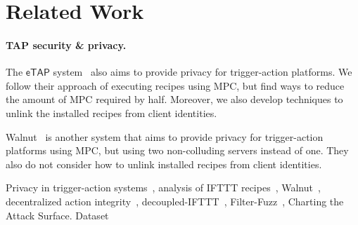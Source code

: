 \section{Related Work}
\label{sec:related}

\paragraph{TAP security \& privacy.}
The $\mathsf{eTAP}$ system~\cite{DBLP:conf/sp/ChenCWSCF21} also aims to provide
privacy for trigger-action platforms. We follow their approach of executing
recipes using MPC, but find ways to reduce the amount of MPC required by
half. Moreover, we also develop techniques to unlink the installed recipes from
client identities.

Walnut~\cite{DBLP:journals/corr/abs-2009-12447} is another system that aims to
provide privacy for trigger-action platforms using MPC, but using two
non-colluding servers instead of one. They also do not consider how to unlink
installed recipes from client identities.

Privacy in trigger-action systems~\cite{DBLP:conf/sp/ChenCWSCF21}, analysis of
IFTTT
recipes~\cite{DBLP:conf/chi/UrHBLMPSL16,DBLP:conf/www/SurbatovichABDJ17, DBLP:conf/imc/MiQZW17},
Walnut~\cite{DBLP:journals/corr/abs-2009-12447}, decentralized action
integrity~\cite{DBLP:conf/ndss/FernandesRJP18},
decoupled-IFTTT~\cite{DBLP:journals/corr/FernandesRJP17},
Filter-Fuzz~\cite{DBLP:journals/access/XuZZCDG19},
Charting the Attack Surface. \cite{DBLP:conf/ccs/WangDYL0G19}
Dataset~\cite{DBLP:journals/corr/abs-2110-00068}
